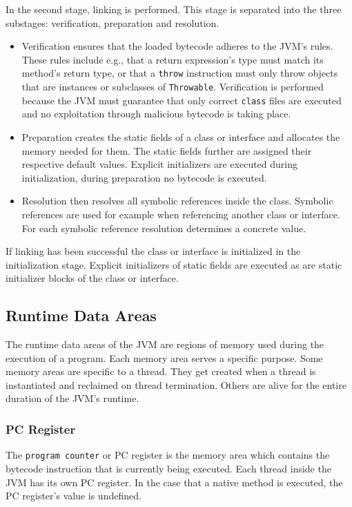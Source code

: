 In the second stage, linking is performed. This stage is separated into the three substages: verification, preparation and resolution. 
\begin{itemize}
    \item Verification ensures that the loaded bytecode adheres to the JVM's rules. These rules include e.g., that a return expression's type must match its method's return type, or that a \texttt{throw} instruction must only throw objects that are instances or subclasses of \texttt{Throwable}. Verification is performed because the JVM must guarantee that only correct \texttt{class} files are executed and no exploitation through malicious bytecode is taking place.
    \item Preparation creates the static fields of a class or interface and allocates the memory needed for them. The static fields further are assigned their respective default values. Explicit initializers are executed during initialization, during preparation no bytecode is executed. 
    \item Resolution then resolves all symbolic references inside the class. Symbolic references are used for example when referencing another class or interface. For each symbolic reference resolution determines a concrete value. 
\end{itemize}
 
If linking has been successful the class or interface is initialized in the initialization stage. Explicit initializers of static fields are executed as are static initializer blocks of the class or interface.


\subsection{Runtime Data Areas}

The runtime data areas of the JVM are regions of memory used during the execution of a program. Each memory area serves a specific purpose. Some memory areas are specific to a thread. They get created when a thread is instantiated and reclaimed on thread termination. Others are alive for the entire duration of the JVM's runtime.  

\subsubsection{PC Register}

The \texttt{program counter} or PC register is the memory area which contains the bytecode instruction that is currently being executed. Each thread inside the JVM has its own PC register. In the case that a native method is executed, the PC register's value is undefined.

